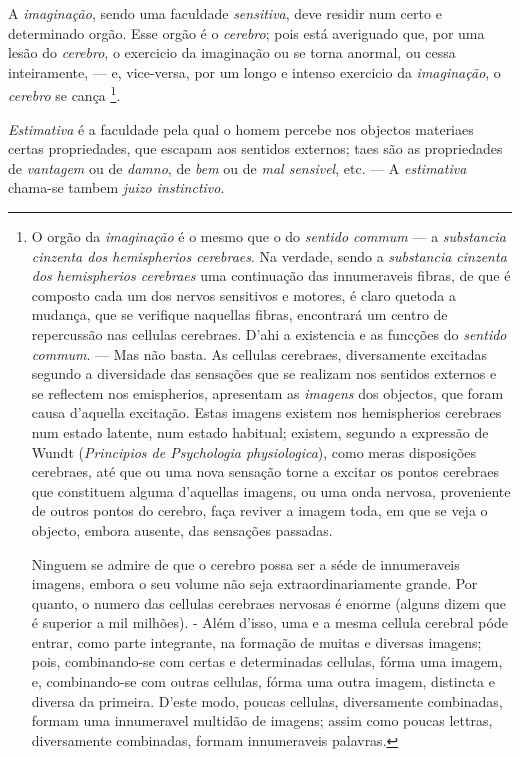 
 
A \emph{imaginação}, sendo uma faculdade \emph{sensitiva}, deve residir num certo e determinado orgão. Esse orgão é o \emph{cerebro}; pois está averiguado que, por uma lesão do \emph{cerebro}, o exercicio da imaginação ou se torna anormal, ou cessa inteiramente, --- e, vice-versa, por um longo e intenso exercicio da \emph{imaginação}, o \emph{cerebro} se cança \footnote{O orgão da \emph{imaginação} é o mesmo que o do \emph{sentido commum} --- a \emph{substancia cinzenta dos hemispherios cerebraes}. Na verdade, sendo a \emph{substancia cinzenta dos hemispherios cerebraes} uma continuação das innumeraveis fibras, de que é composto cada um dos nervos sensitivos e motores, é claro quetoda a mudança, que se verifique naquellas fibras, encontrará um centro de repercussão nas cellulas cerebraes. D'ahi a existencia e as funcções do \emph{sentido commum}. --- Mas não basta. As cellulas cerebraes, diversamente excitadas segundo a diversidade das sensações que se realizam nos sentidos externos e se reflectem nos emispherios, apresentam as \emph{imagens} dos objectos, que foram causa d'aquella excitação. Estas imagens existem nos hemispherios cerebraes num estado latente, num estado habitual; existem, segundo a expressão de Wundt (\emph{Principios de Psychologia physiologica}), como meras disposições cerebraes, até que ou uma nova sensação torne a excitar os pontos cerebraes que constituem alguma d'aquellas imagens, ou uma onda nervosa, proveniente de outros pontos do cerebro, faça reviver a imagem toda, em que se veja o objecto, embora ausente, das sensações passadas.\par Ninguem se admire de que o cerebro possa ser a séde de innumeraveis imagens, embora o seu volume não seja extraordinariamente grande. Por quanto, o numero das cellulas cerebraes nervosas é enorme (alguns dizem que é superior a mil milhões). - Além d'isso, uma e a mesma cellula cerebral póde entrar, como parte integrante, na formação de muitas e diversas imagens; pois, combinando-se com certas e determinadas cellulas, fórma uma imagem, e, combinando-se com outras cellulas, fórma uma outra imagem, distincta e diversa da primeira. D'este modo, poucas cellulas, diversamente combinadas, formam uma innumeravel multidão de imagens; assim como poucas lettras, diversamente combinadas, formam innumeraveis palavras.}.


 
\emph{Estimativa} é a faculdade pela qual o homem percebe nos objectos materiaes certas propriedades, que escapam aos sentidos externos; taes são as propriedades de \emph{vantagem} ou de \emph{damno}, de \emph{bem} ou de \emph{mal sensivel}, etc. --- A \emph{estimativa} chama-se tambem \emph{juizo instinctivo}.

